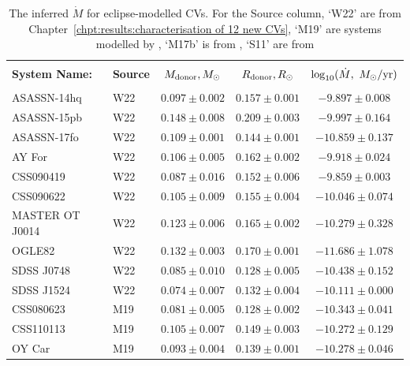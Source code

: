\begin{table}
    \centering
    \caption{The inferred $\dot M$ for eclipse-modelled CVs. For the Source column, `W22' are from Chapter~\ref{chpt:results:characterisation of 12 new CVs}, `M19' are systems modelled by \citet{McAllister2019}, `M17b' is from \citet{mcallister2017b}, `S11' are from \citet{Savoury2011}}
    \label{table:results:mdot modelling}
    \begin{tabular}{llccc}
        \hline \\
        {\bf System Name:} & \textbf{Source} & \textbf{$M_{\rm donor}, M_\odot$}  & \textbf{$R_{\rm donor}, R_\odot$}  & \textbf{$\log_{10}(\dot M,\ M_\odot / {\rm yr})$} \\
        \hline \hline \\
        ASASSN-14hq         &  W22      & $0.097 \pm 0.002$ & $0.157 \pm 0.001$ & $ -9.897 \pm 0.008$ \\
        ASASSN-15pb         &  W22      & $0.148 \pm 0.008$ & $0.209 \pm 0.003$ & $ -9.997 \pm 0.164$ \\
        ASASSN-17fo         &  W22      & $0.109 \pm 0.001$ & $0.144 \pm 0.001$ & $-10.859 \pm 0.137$ \\
        AY For              &  W22      & $0.106 \pm 0.005$ & $0.162 \pm 0.002$ & $ -9.918 \pm 0.024$ \\
        CSS090419           &  W22      & $0.087 \pm 0.016$ & $0.152 \pm 0.006$ & $ -9.859 \pm 0.003$ \\
        CSS090622           &  W22      & $0.105 \pm 0.009$ & $0.155 \pm 0.004$ & $-10.046 \pm 0.074$ \\
        MASTER OT J0014     &  W22      & $0.123 \pm 0.006$ & $0.165 \pm 0.002$ & $-10.279 \pm 0.328$ \\
        OGLE82              &  W22      & $0.132 \pm 0.003$ & $0.170 \pm 0.001$ & $-11.686 \pm 1.078$ \\
        SDSS J0748          &  W22      & $0.085 \pm 0.010$ & $0.128 \pm 0.005$ & $-10.438 \pm 0.152$ \\
        SDSS J1524          &  W22      & $0.074 \pm 0.007$ & $0.132 \pm 0.004$ & $-10.111 \pm 0.000$ \\
        CSS080623           &  M19      & $0.081 \pm 0.005$ & $0.128 \pm 0.002$ & $-10.343 \pm 0.041$ \\
        CSS110113           &  M19      & $0.105 \pm 0.007$ & $0.149 \pm 0.003$ & $-10.272 \pm 0.129$ \\
        OY Car              &  M19      & $0.093 \pm 0.004$ & $0.139 \pm 0.001$ & $-10.278 \pm 0.046$ \\

\end{tabular}
\end{table}
